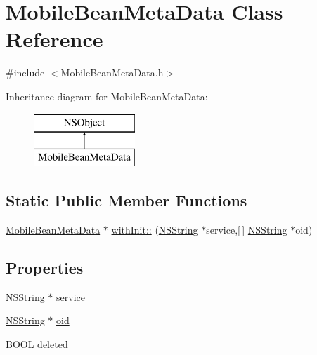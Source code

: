 \hypertarget{interface_mobile_bean_meta_data}{
\section{\-Mobile\-Bean\-Meta\-Data \-Class \-Reference}
\label{interface_mobile_bean_meta_data}
}


{\ttfamily \#include $<$\-Mobile\-Bean\-Meta\-Data.\-h$>$}

\-Inheritance diagram for \-Mobile\-Bean\-Meta\-Data\-:\begin{figure}[H]
\begin{center}
\leavevmode
\includegraphics[height=2.000000cm]{interface_mobile_bean_meta_data}
\end{center}
\end{figure}
\subsection*{\-Static \-Public \-Member \-Functions}
\begin{DoxyCompactItemize}
\item 
\hyperlink{interface_mobile_bean_meta_data}{\-Mobile\-Bean\-Meta\-Data} $\ast$ \hyperlink{interface_mobile_bean_meta_data_a3a62abb5f161e11bc11c7c7c0a5852d7}{with\-Init\-::} (\hyperlink{class_n_s_string}{\-N\-S\-String} $\ast$service,\mbox{[}$\,$\mbox{]} \hyperlink{class_n_s_string}{\-N\-S\-String} $\ast$oid)
\end{DoxyCompactItemize}
\subsection*{\-Properties}
\begin{DoxyCompactItemize}
\item 
\hyperlink{class_n_s_string}{\-N\-S\-String} $\ast$ \hyperlink{interface_mobile_bean_meta_data_a92020136f5c9b890d273a4bffc79041f}{service}
\item 
\hyperlink{class_n_s_string}{\-N\-S\-String} $\ast$ \hyperlink{interface_mobile_bean_meta_data_aaf38f1170c640abeea172c9d97296bec}{oid}
\item 
\-B\-O\-O\-L \hyperlink{interface_mobile_bean_meta_data_ab691f741ac2f8586e8cee395fa14ec9b}{deleted}
\end{DoxyCompactItemize}


